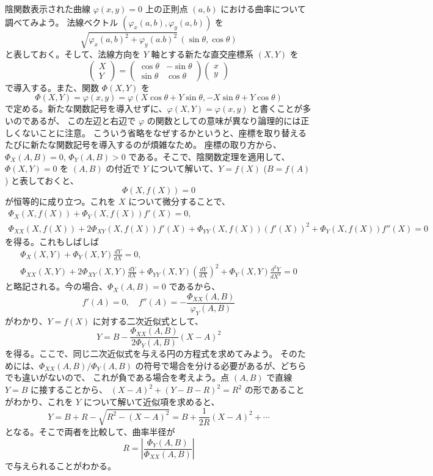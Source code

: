 \documentclass[a4paper]{jsarticle}
\theoremstyle{definition}
\theoremstyle{remark}
\begin{document}
陰関数表示された曲線 $\varphi(x,y) = 0$ 上の正則点 $(a,b)$ における曲率について調べてみよう。
法線ベクトル $(\varphi_x(a,b),\varphi_y(a,b))$ を
\[
\sqrt{\varphi_x(a,b)^2 + \varphi_y(a.b)^2}\, (\sin\theta, \cos\theta)
\]
と表しておく。そして、法線方向を $Y$ 軸とする新たな直交座標系 $(X,Y)$ を
\[
\begin{pmatrix}
X\\
Y
\end{pmatrix} 
= 
\begin{pmatrix}
\cos\theta & -\sin\theta\\
\sin\theta & \cos\theta
\end{pmatrix} 
\begin{pmatrix}
x\\
y
\end{pmatrix} 
\]
で導入する。また、関数 $\Phi(X,Y)$ を
\[
\Phi(X,Y) = \varphi(x,y) = \varphi(X\cos\theta + Y\sin \theta, -X\sin\theta + Y\cos\theta)
\]
で定める。新たな関数記号を導入せずに、$\varphi(X,Y) = \varphi(x,y)$ と書くことが多いのであるが、
この左辺と右辺で $\varphi$ の関数としての意味が異なり論理的には正しくないことに注意。
こういう省略をなぜするかというと、座標を取り替えるたびに新たな関数記号を導入するのが煩雑なため。
座標の取り方から、$\Phi_X(A,B) = 0$, $\Phi_Y(A,B) > 0$ である。そこで、陰関数定理を適用して、
$\Phi(X,Y) = 0$ を $(A,B)$ の付近で $Y$ について解いて、$Y = f(X)$ ($B = f(A)$) と表しておくと、
\[
\Phi(X,f(X)) = 0 
\]
が恒等的に成り立つ。これを $X$ について微分することで、
\begin{gather*}
\Phi_X(X,f(X)) + \Phi_Y(X,f(X)) f'(X) = 0,\\ 
\Phi_{XX}(X,f(X)) + 2\Phi_{XY}(X,f(X)) f'(X) + \Phi_{YY}(X,f(X)) \left( f'(X) \right)^2 
+ \Phi_Y(X,f(X)) f''(X) = 0
\end{gather*}
を得る。これもしばしば
\begin{gather*}
\Phi_X(X,Y) + \Phi_Y(X,Y) \frac{dY}{dX} = 0,\\ 
\Phi_{XX}(X,Y) + 2\Phi_{XY}(X,Y) \frac{dY}{dX} + \Phi_{YY}(X,Y) \left( \frac{dY}{dX} \right)^2 
+ \Phi_Y(X,Y) \frac{d^2Y}{dX^2} = 0
\end{gather*}
と略記される。今の場合、$\Phi_X(A,B) = 0$ であるから、
\[
f'(A) = 0, 
\quad 
f''(A) = - \frac{\Phi_{XX}(A,B)}{\varphi_Y(A,B)} 
\]
がわかり、$Y = f(X)$ に対する二次近似式として、
\[
Y = B - \frac{\Phi_{XX}(A,B)}{2\Phi_Y(A,B)} (X-A)^2
\]
を得る。ここで、同じ二次近似式を与える円の方程式を求めてみよう。
そのためには、$\Phi_{XX}(A,B)/\Phi_Y(A,B)$ の符号で場合を分ける必要があるが、どちらでも違いがないので、
これが負である場合を考えよう。点 $(A,B)$ で直線 $Y=B$ に接することから、
$(X-A)^2 + (Y-B-R)^2 = R^2$ の形であることがわかり、これを $Y$ について解いて近似項を求めると、
\[
Y = B + R - \sqrt{R^2 - (X-A)^2} = B + \frac{1}{2R} (X-A)^2 + \cdots 
\]
となる。そこで両者を比較して、曲率半径が
\[
R = \left| \frac{\Phi_Y(A,B)}{\Phi_{XX}(A,B)} \right|
\]
で与えられることがわかる。
\end{document}
